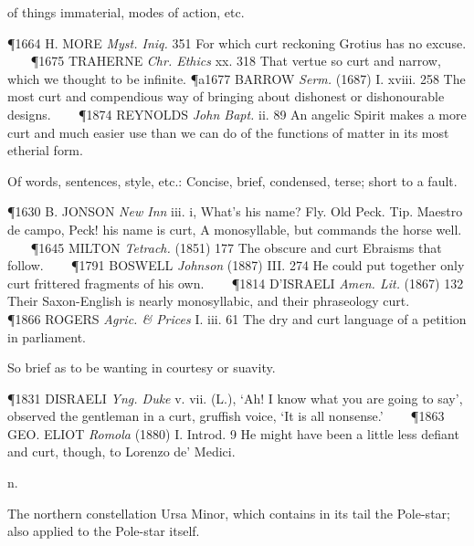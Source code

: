 \begin{description}[wide, labelwidth=!, labelindent=0pt]
\begin{myenumerate}
 of things immaterial, modes of action, etc.

\P 1664 H. MORE  \textit{Myst. Iniq.} 351 For which curt reckoning Grotius has no excuse.    
\P 1675 TRAHERNE  \textit{Chr. Ethics} xx. 318 That vertue so curt and narrow, which we thought to be infinite.
\P a1677 BARROW  \textit{Serm.} (1687) I. xviii. 258 The most curt and compendious way of bringing about dishonest or dishonourable designs.    
\P 1874 REYNOLDS  \textit{John Bapt.} ii. 89 An angelic Spirit makes a more curt and much easier use than we can do of the functions of matter in its most etherial form.

 Of words, sentences, style, etc.: Concise, brief, condensed, terse; short to a fault.

\P 1630 B. JONSON  \textit{New Inn} iii. i, What's his name? Fly. Old Peck. Tip. Maestro de campo, Peck! his name is curt, A monosyllable, but commands the horse well.    
\P 1645 MILTON  \textit{Tetrach.} (1851) 177 The obscure and curt Ebraisms that follow.    
\P 1791 BOSWELL  \textit{Johnson} (1887) III. 274 He could put together only curt frittered fragments of his own.    
\P 1814 D'ISRAELI  \textit{Amen. Lit.} (1867) 132 Their Saxon-English is nearly monosyllabic, and their phraseology curt.    
\P 1866 ROGERS  \textit{Agric. \& Prices} I. iii. 61 The dry and curt language of a petition in parliament.

 So brief as to be wanting in courtesy or suavity.

\P 1831 DISRAELI  \textit{Yng. Duke} v. vii. (L.), ‘Ah! I know what you are going to say’, observed the gentleman in a curt, gruffish voice, ‘It is all nonsense.’    
\P 1863 GEO. ELIOT  \textit{Romola} (1880) I. Introd. 9 He might have been a little less defiant and curt, though, to Lorenzo de' Medici.
\end{myenumerate}


 n.

\noindent {}

\vspace{-0.3cm}

\begin{myenumerate}

 The northern constellation Ursa Minor, which contains in its tail the Pole-star; also applied to the Pole-star itself.


\end{myenumerate}
\end{description}
